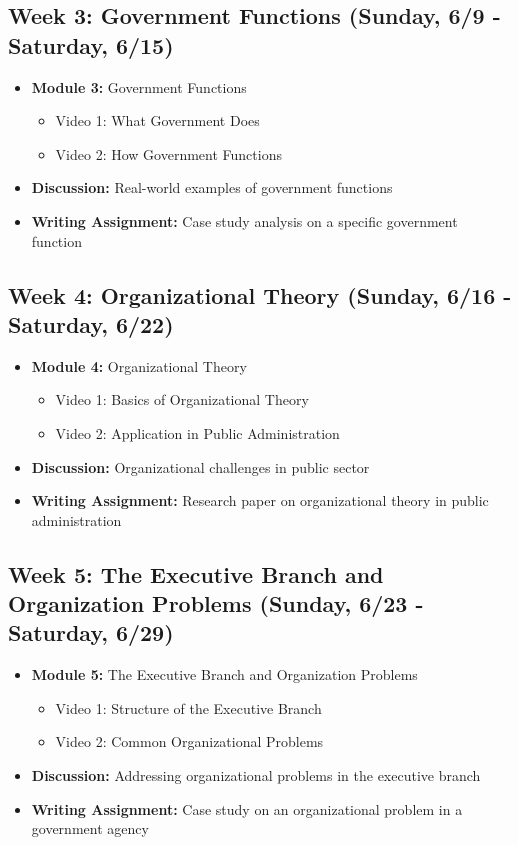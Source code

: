 \documentclass[12pt, letterpaper]{article}
\begin{document}
\subsection*{Week 3: Government Functions (Sunday, 6/9 - Saturday, 6/15)}
\begin{itemize}
    \item \textbf{Module 3:} Government Functions
    \begin{itemize}
        \item Video 1: What Government Does
        \item Video 2: How Government Functions
    \end{itemize}
    \item \textbf{Discussion:} Real-world examples of government functions
    \item \textbf{Writing Assignment:} Case study analysis on a specific government function
\end{itemize}

\subsection*{Week 4: Organizational Theory (Sunday, 6/16 - Saturday, 6/22)}
\begin{itemize}
    \item \textbf{Module 4:} Organizational Theory
    \begin{itemize}
        \item Video 1: Basics of Organizational Theory
        \item Video 2: Application in Public Administration
    \end{itemize}
    \item \textbf{Discussion:} Organizational challenges in public sector
    \item \textbf{Writing Assignment:} Research paper on organizational theory in public administration
\end{itemize}

\subsection*{Week 5: The Executive Branch and Organization Problems (Sunday, 6/23 - Saturday, 6/29)}
\begin{itemize}
    \item \textbf{Module 5:} The Executive Branch and Organization Problems
    \begin{itemize}
        \item Video 1: Structure of the Executive Branch
        \item Video 2: Common Organizational Problems
    \end{itemize}
    \item \textbf{Discussion:} Addressing organizational problems in the executive branch
    \item \textbf{Writing Assignment:} Case study on an organizational problem in a government agency
\end{itemize}
\end{document}
